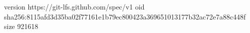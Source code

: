 version https://git-lfs.github.com/spec/v1
oid sha256:8115afd3d35ba02f77161e1b79ec800423a369651013177b32ac72e7a88c448f
size 921618
